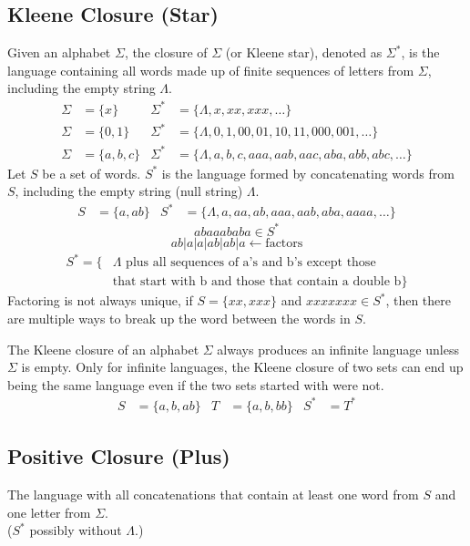 \subsection{Kleene Closure (Star)}
Given an alphabet \(\Sigma\), the closure of \(\Sigma\) (or Kleene star), denoted as \(\Sigma^*\), is the language containing all words made up of finite sequences of letters from \(\Sigma\), including the empty string \(\Lambda\).
\begin{align*}
    \Sigma&=\{x\} & \Sigma^*&=\{\Lambda, x, xx, xxx,\ldots\}\\
    \Sigma&=\{0,1\} & \Sigma^*&=\{\Lambda,0,1,00,01,10,11,000,001,\ldots\}\\
    \Sigma&=\{a,b,c\} & \Sigma^*&=\{\Lambda,a,b,c,aaa,aab,aac,aba,abb,abc,\ldots\}
\end{align*}
Let \(S\) be a set of words. \(S^*\) is the language formed by concatenating words from \(S\), including the empty string (null string) \(\Lambda\).
\begin{align*}
    S&=\{a,ab\} & S^*&=\{\Lambda,a,aa,ab,aaa,aab,aba,aaaa,\ldots\}
\end{align*}
\[
    abaaababa \in S^*
\]
\[
    ab|a|a|ab|ab|a \leftarrow \text{factors}
\]
\begin{align*}
    S^*=\{&\Lambda \text{ plus all sequences of a's and b's except those}\\
    &\text{that start with b and those that contain a double b}\}
\end{align*}
Factoring is not always unique, if \(S=\{xx,xxx\}\) and \(xxxxxxx \in S^*\), then there are multiple ways to break up the word between the words in \(S\).

The Kleene closure of an alphabet \(\Sigma\) always produces an infinite language unless \(\Sigma\) is empty. Only for infinite languages, the Kleene closure of two sets can end up being the same language even if the two sets started with were not.
\begin{align*}
    S &= \{a,b,ab\} & T &= \{a, b, bb\} & S^* &= T^*
\end{align*}

\subsection{Positive Closure (Plus)}
The language with all concatenations that contain at least one word from \(S\) and one letter from \(\Sigma\).\\
(\(S^*\) possibly without \(\Lambda\).)

